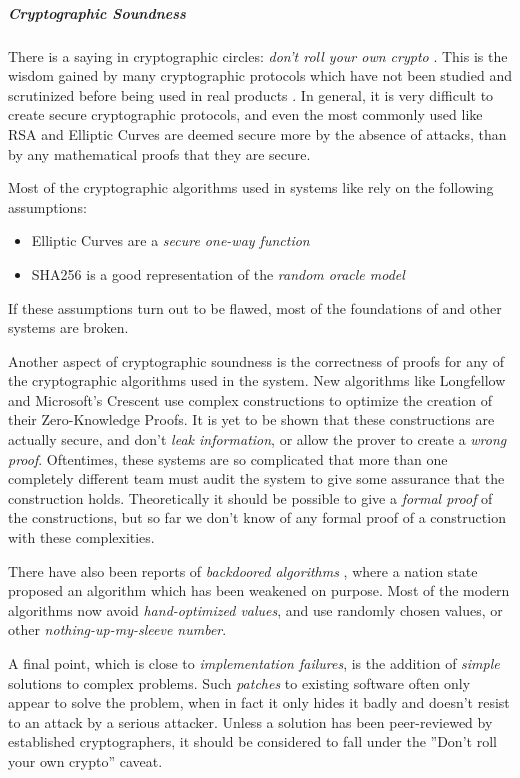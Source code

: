 \subparagraph{Cryptographic Soundness}

There is a saying in cryptographic circles: \emph{don't roll your own crypto} \cite{SchneierLaw11}.
This is the wisdom gained by many cryptographic protocols which have not been
studied and scrutinized before being used in real products \cite{Vaudenay02}.
In general, it is very difficult to create secure cryptographic protocols, and even
the most commonly used like RSA and Elliptic Curves are deemed secure more by the
absence of attacks, than by any mathematical proofs that they are secure.

Most of the cryptographic algorithms used in \eid systems like \swiyu rely on the
following assumptions:
\begin{itemize}
    \item Elliptic Curves are a \emph{secure one-way function}
    \item SHA256 is a good representation of the \emph{random oracle model}
\end{itemize}
If these assumptions turn out to be flawed, most of the foundations of \eid and other systems
are broken.

Another aspect of cryptographic soundness is the correctness of proofs for any of the cryptographic
algorithms used in the system.
New algorithms like Longfellow \cite{FS24} and Microsoft's Crescent \cite{FFL25} use complex constructions to optimize the creation of their
Zero-Knowledge Proofs.
It is yet to be shown that these constructions are actually secure, and don't 
\emph{leak information}, or allow the prover to create a \emph{wrong proof}.
Oftentimes, these systems are so complicated that more than one completely different team must audit the system to give some assurance that the construction holds.
Theoretically it should be possible to give a \emph{formal proof} of the constructions,
but so far we don't know of any formal proof of a construction with these
complexities.

There have also been reports of \emph{backdoored algorithms} \cite{DualEC},
where a nation state proposed an algorithm which has been weakened on purpose.
Most of the modern algorithms now avoid \emph{hand-optimized values}, and use
randomly chosen values, or other \emph{nothing-up-my-sleeve number}\cite{Salsa20}.

A final point, which is close to \emph{implementation failures}, is the addition
of \emph{simple} solutions to complex problems.
Such \emph{patches} to existing software often only appear to solve the problem,
when in fact it only hides it badly and doesn't resist to an attack by a serious
attacker.
Unless a solution has been peer-reviewed by established cryptographers, it should
be considered to fall under the ''Don't roll your own crypto'' \cite{SchneierLaw11} caveat.

